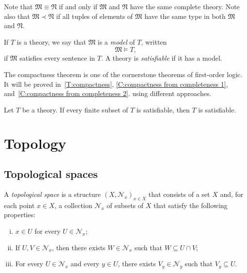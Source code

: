 \documentclass{scrartcl}
\newcommand{\FM}{\mathfrak{M}}
\newcommand{\FN}{\mathfrak{N}}
\begin{document}
Note that $\mathfrak{M}\equiv\mathfrak{N}$ if and only if $\mathfrak{M}$ and $\mathfrak{N}$ have the same complete theory. Note also that $\mathfrak{M}\prec\mathfrak{N}$ if all tuples of elements of $\FM$ have the same type in both $\FM$ and $\FN$.


\begin{definition}
If $T$ is a theory, we say that $\mathfrak{M}$ is a \emph{model} of $T$, written 
\[
\mathfrak{M}\models T,
\]
if $\mathfrak{M}$ satisfies every sentence in $T$.
A theory is \emph{satisfiable} if it has a model.
\end{definition}


The compactness theorem is one of the cornerstone theorems of first-order logic. It will be proved in~\ref{T:compactness}, \ref{C:compactness from completeness 1}, and~\ref{C:compactness from completeness 2}. using different approaches.

\begin{theorem}
\label{T:compactness from Los}
Let $T$ be a theory. If every finite subset of $T$ is satisfiable, then $T$ is satisfiable.
\end{theorem}


\section{Topology}
\label{S:topology}

\subsection{Topological spaces}

\begin{definition}
\label{D:topological space}
    A \emph{topological space} is a structure $(X, \mathscr{N}_x)_{x\in X}$  that consists of a set $X$ and, for each point $x\in X$, a collection $\mathscr{N}_x$ of subsets of $X$ that satisfy the following properties:

    \begin{enumerate}[i)]
        \item $x\in U$ for every $U\in \mathscr{N}_x$;
        \item If $U,V\in \mathscr{N}_x$, then there exists $W\in \mathscr{N}_x$ such that $W\subseteq U\cap V$;
        \item For every $U\in \mathscr{N}_x$ and every $y\in U$, there exists $V_y\in \mathscr{N}_y$ such that $V_y\subseteq U$.
        
    \end{enumerate}
\end{definition}
\end{document}
